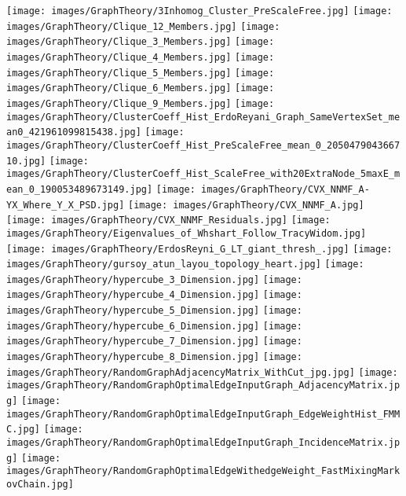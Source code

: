 \texttt{[image: images/GraphTheory/3Inhomog\_Cluster\_PreScaleFree.jpg]}
\texttt{[image: images/GraphTheory/Clique\_12\_Members.jpg]}
\texttt{[image: images/GraphTheory/Clique\_3\_Members.jpg]}
\texttt{[image: images/GraphTheory/Clique\_4\_Members.jpg]}
\texttt{[image: images/GraphTheory/Clique\_5\_Members.jpg]}
\texttt{[image: images/GraphTheory/Clique\_6\_Members.jpg]}
\texttt{[image: images/GraphTheory/Clique\_9\_Members.jpg]}
\texttt{[image: images/GraphTheory/ClusterCoeff\_Hist\_ErdoReyani\_Graph\_SameVertexSet\_mean0\_421961099815438.jpg]}
\texttt{[image: images/GraphTheory/ClusterCoeff\_Hist\_PreScaleFree\_mean\_0\_205047904366710.jpg]}
\texttt{[image: images/GraphTheory/ClusterCoeff\_Hist\_ScaleFree\_with20ExtraNode\_5maxE\_mean\_0\_190053489673149.jpg]}
\texttt{[image: images/GraphTheory/CVX\_NNMF\_A-YX\_Where\_Y\_X\_PSD.jpg]}
\texttt{[image: images/GraphTheory/CVX\_NNMF\_A.jpg]}
\texttt{[image: images/GraphTheory/CVX\_NNMF\_Residuals.jpg]}
\texttt{[image: images/GraphTheory/Eigenvalues\_of\_Whshart\_Follow\_TracyWidom.jpg]}
\texttt{[image: images/GraphTheory/ErdosReyni\_G\_LT\_giant\_thresh\_.jpg]}
\texttt{[image: images/GraphTheory/gursoy\_atun\_layou\_topology\_heart.jpg]}
\texttt{[image: images/GraphTheory/hypercube\_3\_Dimension.jpg]}
\texttt{[image: images/GraphTheory/hypercube\_4\_Dimension.jpg]}
\texttt{[image: images/GraphTheory/hypercube\_5\_Dimension.jpg]}
\texttt{[image: images/GraphTheory/hypercube\_6\_Dimension.jpg]}
\texttt{[image: images/GraphTheory/hypercube\_7\_Dimension.jpg]}
\texttt{[image: images/GraphTheory/hypercube\_8\_Dimension.jpg]}
\texttt{[image: images/GraphTheory/RandomGraphAdjacencyMatrix\_WithCut\_jpg.jpg]}
\texttt{[image: images/GraphTheory/RandomGraphOptimalEdgeInputGraph\_AdjacencyMatrix.jpg]}
\texttt{[image: images/GraphTheory/RandomGraphOptimalEdgeInputGraph\_EdgeWeightHist\_FMMC.jpg]}
\texttt{[image: images/GraphTheory/RandomGraphOptimalEdgeInputGraph\_IncidenceMatrix.jpg]}
\texttt{[image: images/GraphTheory/RandomGraphOptimalEdgeWithedgeWeight\_FastMixingMarkovChain.jpg]}
